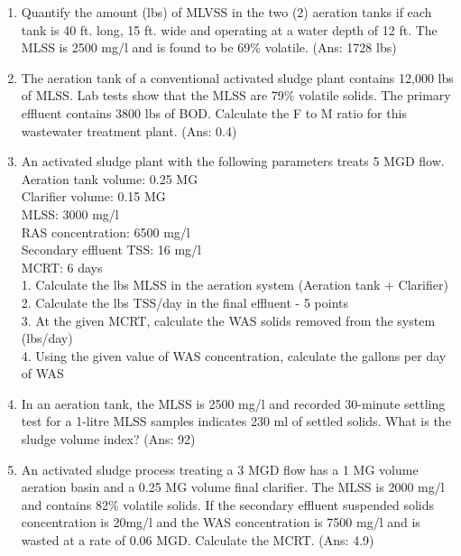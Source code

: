 \begin{enumerate}
\item Quantify the amount (lbs) of MLVSS in the two (2) aeration tanks if each tank is 40 ft. long, 15 ft. wide and operating at a water depth of 12 ft. The MLSS is 2500 mg/l and is found to be 69\% volatile. (Ans: 1728 lbs) \\

\item The aeration tank of a conventional activated sludge plant contains 12,000 lbs of MLSS. Lab tests show that the MLSS are 79\% volatile solids. The primary effluent contains 3800 lbs of BOD. Calculate the F to M ratio for this wastewater treatment plant. (Ans: 0.4)\\


\item An activated sludge plant with the following parameters treats 5 MGD flow. \\
Aeration tank volume: 0.25 MG\\
Clarifier volume: 0.15 MG\\
MLSS:  3000 mg/l\\
RAS concentration: 6500 mg/l\\
Secondary effluent TSS:  16 mg/l\\
MCRT: 6 days\\
1.  Calculate the lbs MLSS in the aeration system (Aeration tank + Clarifier)\\
2. Calculate the lbs TSS/day in the final effluent - 5 points\\
3. At the given MCRT, calculate the WAS solids removed from the system (lbs/day)\\
4. Using the given value of WAS concentration, calculate the gallons per day of WAS\\


\item In an aeration tank, the MLSS is 2500 mg/l and recorded 30-minute settling test for a 1-litre MLSS samples indicates 230 ml of settled solids. What is the sludge volume index? (Ans: 92) \\

\item An activated sludge process treating a 3 MGD flow has a 1 MG volume aeration basin and a 0.25 MG volume final clarifier.  The MLSS is 2000 mg/l and contains 82\% volatile solids.  If the secondary effluent suspended solids concentration is 20mg/l and the WAS concentration is 7500 mg/l and is wasted at a rate of 0.06 MGD.  Calculate the MCRT. (Ans: 4.9)\\



\end{enumerate}

